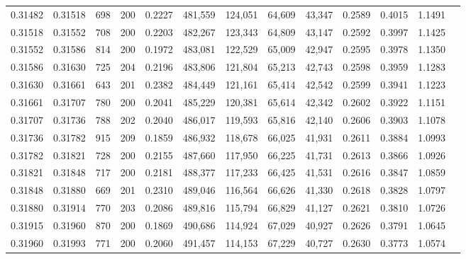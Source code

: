 \begin{tabular}{rrrrrrrrrrrrr}
0.31482 & 0.31518 &   698 & 200 &                                     0.2227 & 481,559 & 124,051 &  64,609 &  43,347 & 0.2589 & 0.4015 & 1.1491 \\
0.31518 & 0.31552 &   708 & 200 &                                     0.2203 & 482,267 & 123,343 &  64,809 &  43,147 & 0.2592 & 0.3997 & 1.1425 \\
0.31552 & 0.31586 &   814 & 200 &                                     0.1972 & 483,081 & 122,529 &  65,009 &  42,947 & 0.2595 & 0.3978 & 1.1350 \\
0.31586 & 0.31630 &   725 & 204 &                                     0.2196 & 483,806 & 121,804 &  65,213 &  42,743 & 0.2598 & 0.3959 & 1.1283 \\
0.31630 & 0.31661 &   643 & 201 &                                     0.2382 & 484,449 & 121,161 &  65,414 &  42,542 & 0.2599 & 0.3941 & 1.1223 \\
0.31661 & 0.31707 &   780 & 200 &                                     0.2041 & 485,229 & 120,381 &  65,614 &  42,342 & 0.2602 & 0.3922 & 1.1151 \\
0.31707 & 0.31736 &   788 & 202 &                                     0.2040 & 486,017 & 119,593 &  65,816 &  42,140 & 0.2606 & 0.3903 & 1.1078 \\
0.31736 & 0.31782 &   915 & 209 &                                     0.1859 & 486,932 & 118,678 &  66,025 &  41,931 & 0.2611 & 0.3884 & 1.0993 \\
0.31782 & 0.31821 &   728 & 200 &                                     0.2155 & 487,660 & 117,950 &  66,225 &  41,731 & 0.2613 & 0.3866 & 1.0926 \\
0.31821 & 0.31848 &   717 & 200 &                                     0.2181 & 488,377 & 117,233 &  66,425 &  41,531 & 0.2616 & 0.3847 & 1.0859 \\
0.31848 & 0.31880 &   669 & 201 &                                     0.2310 & 489,046 & 116,564 &  66,626 &  41,330 & 0.2618 & 0.3828 & 1.0797 \\
0.31880 & 0.31914 &   770 & 203 &                                     0.2086 & 489,816 & 115,794 &  66,829 &  41,127 & 0.2621 & 0.3810 & 1.0726 \\
0.31915 & 0.31960 &   870 & 200 &                                     0.1869 & 490,686 & 114,924 &  67,029 &  40,927 & 0.2626 & 0.3791 & 1.0645 \\
0.31960 & 0.31993 &   771 & 200 &                                     0.2060 & 491,457 & 114,153 &  67,229 &  40,727 & 0.2630 & 0.3773 & 1.0574 \\

\end{tabular}
